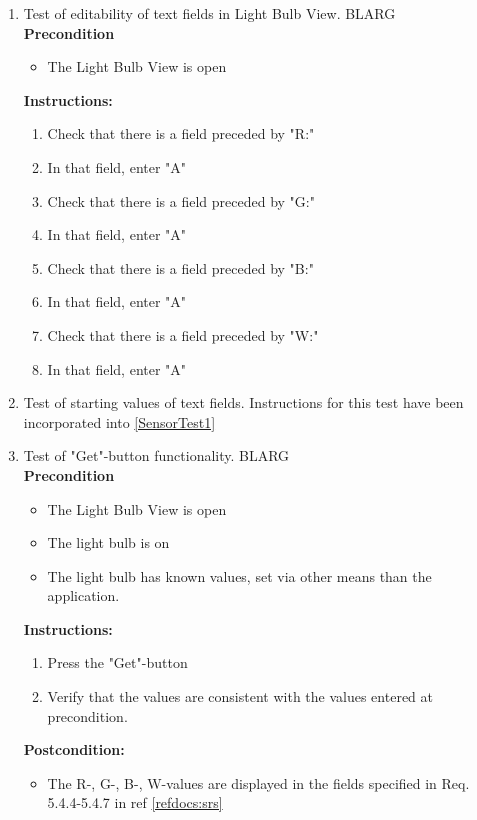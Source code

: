 \documentclass[a4paper]{article}
\newlength{\testlabellength}
\newenvironment{testlist}{\begin{enumerate}[label=\bfseries Instruction \thesubsection.\arabic* , labelindent=0pt, labelwidth=\testlabellength , leftmargin=2cm]}{\end{enumerate}}
\newenvironment{precondition}{
{\color{white}BLARG}\\ 
\textbf{Precondition}
\begin{itemize}[labelindent=0cm, labelwidth=2cm , leftmargin=1cm]
}
{\end{itemize}}
\newenvironment{instruction}{
\textbf{Instructions:}
\begin{enumerate}[label=\bfseries  \arabic*., labelindent=0cm, labelwidth=2cm , leftmargin=1cm]
}
{\end{enumerate}}
\newenvironment{postcondition}{
\textbf{Postcondition:}
\begin{itemize}[labelindent=0cm, labelwidth=2cm , leftmargin=1cm]
}
{\end{itemize}}
\begin{document}
\begin{appendices}
\begin{testlist}
\newpage
   	\item Test of editability of text fields in Light Bulb View.
   		\begin{precondition}
   			\item The Light Bulb View is open
		\end{precondition}
    	\begin{instruction}
    		\item Check that there is a field preceded by "R:"
    		\item In that field, enter "A"
    		\item Check that there is a field preceded by "G:"
    		\item In that field, enter "A"
    		\item Check that there is a field preceded by "B:"
    		\item In that field, enter "A"
    		\item Check that there is a field preceded by "W:"
    		\item In that field, enter "A"
    	\end{instruction}

	\item Test of starting values of text fields.
		Instructions for this test have been incorporated into \ref{SensorTest1}

	\item Test of "Get"-button functionality.
		\begin{precondition}
			\item The Light Bulb View is open
			\item The light bulb is on
			\item The light bulb has known values, set via other means than the application.
		\end{precondition}
		\begin{instruction}
			\item Press the "Get"-button
			\item Verify that the values are consistent with the values entered at precondition.
		\end{instruction}
		\begin{postcondition}
			\item The R-, G-, B-, W-values are displayed in the fields specified in Req. 5.4.4-5.4.7 in ref \ref{refdocs:srs}
		\end{postcondition}


\end{testlist}
\end{appendices}
\end{document}
